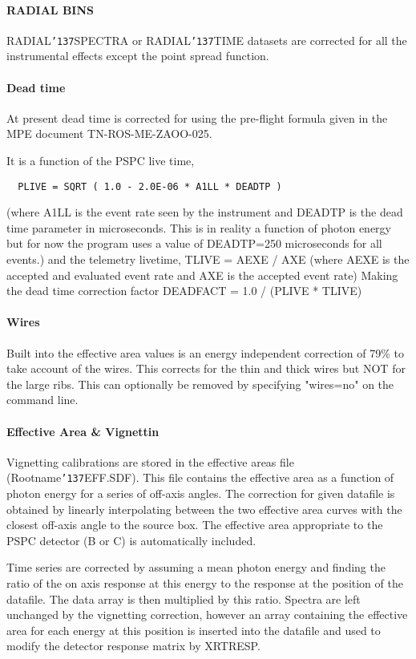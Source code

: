 \documentclass{book}
\renewcommand{\_}{{\tt\char'137}}     %
\begin{document}
\paragraph{RADIAL BINS}
RADIAL\_SPECTRA or RADIAL\_TIME datasets are corrected for all the
instrumental effects except the point spread function.

\paragraph{Dead time}
At present dead time is corrected for using the pre-flight formula
given in the MPE document TN-ROS-ME-ZAOO-025.

It is a function of the PSPC live time,

\begin{verbatim}
  PLIVE = SQRT ( 1.0 - 2.0E-06 * A1LL * DEADTP )
\end{verbatim}
(where A1LL is the event rate seen by the instrument and DEADTP is
the dead time parameter in microseconds. This is in reality a
function of photon energy but for now the program uses a value of
DEADTP=250 microseconds for all events.)
and the telemetry livetime,
TLIVE = AEXE / AXE
(where AEXE is the accepted and evaluated event rate and AXE is the
accepted event rate)
Making the dead time correction factor
DEADFACT = 1.0 / (PLIVE * TLIVE)
\paragraph{Wires}
Built into the effective area values is an energy independent correction
of 79\% to take account of the wires. This corrects for the thin and thick
wires but NOT for the large ribs. This can optionally be removed by
specifying "wires=no" on the command line.

\paragraph{Effective Area \& Vignettin}
Vignetting calibrations are stored in the effective areas file
(Rootname\_EFF.SDF). This file contains the effective area as a
function of photon energy for a series of off-axis angles. The
correction for given datafile is obtained by linearly interpolating
between the two effective area curves with the closest off-axis angle
to the source box. The effective area appropriate to the PSPC detector
(B or C) is automatically included.

Time series are corrected by assuming a mean photon energy and finding
the ratio of the on axis response at this energy to the response at the
position of the datafile. The data array is then multiplied by this
ratio. Spectra are left unchanged by the vignetting correction, however
an array containing the effective area for each energy at this position
is inserted into the datafile and used to modify the detector response
matrix by XRTRESP.
\end{document}
